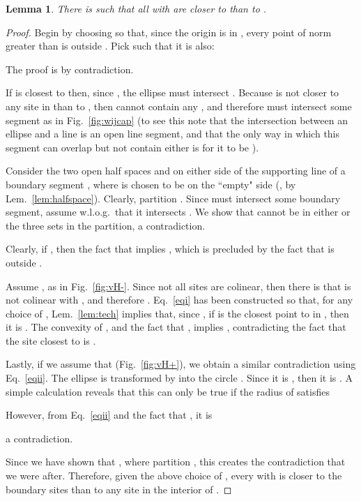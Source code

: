 \documentclass[11pt]{article}
\newtheorem{lemma}[theorem]{Lemma}
\begin{document}
\begin{lemma}\label{lem:VW}
	There is  such that all  with  
are closer to  than to . \end{lemma}
\begin{proof}
Begin by choosing  so that, since the
origin is in , every point of norm greater than  is outside .
Pick  such that it is also:


The proof is by contradiction. 

If  is closest to
 then, since , the ellipse 
 must intersect . 
Because  is not closer to any site in
 than to , then  cannot contain any
, and therefore  must intersect some segment 
as in Fig.~\ref{fig:wijcap} (to see this note that the intersection between an ellipse
and a line is an open line segment, and that the only way in which this
segment can overlap  but not contain either  is for
it to be ). 



Consider the two open half spaces  and  on either side of
the supporting line of a boundary segment , where
 is chosen to be on the ``empty" side
(, by Lem.~\ref{lem:halfspace}). 
Clearly,  partition . 
Since  must intersect some boundary segment, assume w.l.o.g.\   that
it intersects . We show that  cannot be in either
or the three sets in the partition, a contradiction. 


Clearly, if , then the fact that 
implies , which is precluded by
the fact that  is outside . 

Assume , as in Fig.~\ref{fig:vH-}. 
Since not all sites are colinear, then there is  that is not colinear
with , and therefore . 
Eq.~\ref{eqi} has been constructed so that, for any choice of
, Lem.~\ref{lem:tech} implies that,
since , if  is the
closest point to  in , then it is . 
The convexity of , and the fact that
, 
implies , 
contradicting the fact that the site closest to  is . 


Lastly, if we assume that  (Fig.~\ref{fig:vH+}), 
we obtain a similar contradiction using Eq.~\ref{eqii}. 
The ellipse  is transformed by  into the circle
. 
Since it is , 
then it is  . 
A simple calculation reveals that this can only be true if the radius of
 satisfies

However, from Eq.~\ref{eqii} and the fact that , it is 

a contradiction. 

Since we have shown that , 
where  partition , 
this creates the contradiction that we were after. 
Therefore, given the above choice of , 
every  with  is closer to the boundary sites  than to any
site  in the interior of . 
\end{proof}
\end{document}
